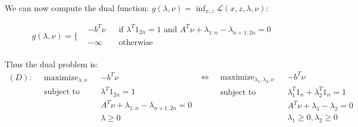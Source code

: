 \documentclass{article}
\begin{document}
We can now compute the dual function: $g(\lambda, \nu) = \inf_{x, z} \mathcal{L}(x, z, \lambda, \nu)$:

\begin{equation*}
    g(\lambda, \nu) = \bigg\{
    \begin{aligned}
         & -b^T\nu &  & \text{if $\lambda^T1_{2n} = 1$ and $A^T\nu + \lambda_{1:n} - \lambda_{n+1:2n} = 0$} \\
         & -\infty &  & \text{otherwise}                                                                    \\
    \end{aligned}
\end{equation*}


Thus the dual problem is:
\begin{equation*}
    \begin{aligned}
        (D):\;\; & \text{maximize}_{\lambda, \nu} &  & -b^T\nu                                       \\
                 & \text{subject to}              &  & \lambda^T1_{2n} = 1                           \\
                 &                                &  & A^T\nu + \lambda_{1:n} - \lambda_{n+1:2n} = 0 \\
                 &                                &  & \lambda \ge 0                                 \\
    \end{aligned}
    \;
    \begin{aligned}
        \Leftrightarrow\;\; & \text{maximize}_{\lambda_1, \lambda_2, \nu} &  & -b^T\nu                             \\
                            & \text{subject to}                           &  & \lambda_1^T1_n + \lambda_2^T1_n = 1 \\
                            &                                             &  & A^T\nu + \lambda_1 - \lambda_2 = 0  \\
                            &                                             &  & \lambda_1 \ge 0, \lambda_2 \ge 0    \\
    \end{aligned}
\end{equation*}
\end{document}
